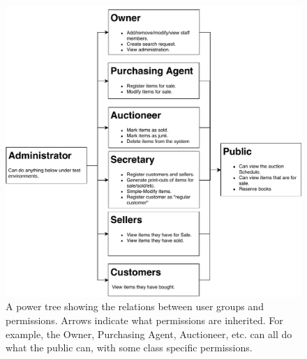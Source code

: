 \begin{figure}[H]
	\centering
	\includegraphics[scale=.75]{uml/power_tree.pdf}
	\caption*{A power tree showing the relations between user groups and permissions. Arrows indicate what permissions are inherited. For example, the Owner, Purchasing Agent, Auctioneer, etc. can all do what the public can, with some class specific permissions.}
\end{figure}